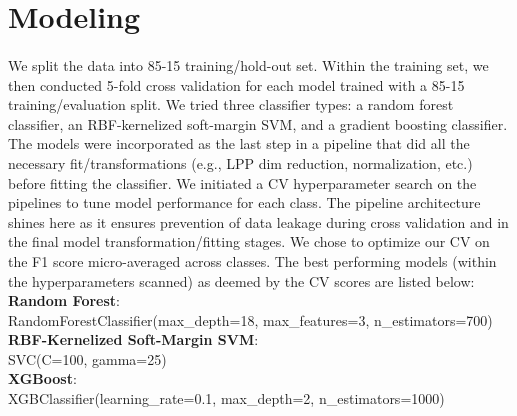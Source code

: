 \documentclass{article}
\begin{document}
\section{Modeling}
\paragraph{} We split the data into 85-15 training/hold-out set. Within the training set, we then conducted 5-fold cross validation for each model trained with a 85-15  training/evaluation split. We tried three classifier types: a random forest classifier, an RBF-kernelized soft-margin SVM, and a gradient boosting classifier. The models were incorporated as the last step in a pipeline that did all the necessary fit/transformations (e.g., LPP dim reduction, normalization, etc.) before fitting the classifier. We initiated a CV hyperparameter search on the pipelines to tune model performance for each class. The pipeline architecture shines here as it ensures prevention of data leakage during cross validation and in the final model transformation/fitting stages. We chose to optimize our CV on the F1 score micro-averaged across classes. The best performing models (within the hyperparameters scanned) as deemed by the CV scores are listed below: \\
\textbf{Random Forest}:\\ RandomForestClassifier(max\_depth=18, max\_features=3, n\_estimators=700) \\ 
\textbf{RBF-Kernelized Soft-Margin SVM}: \\ SVC(C=100, gamma=25) \\
\textbf{XGBoost}:\\ XGBClassifier(learning\_rate=0.1, max\_depth=2, n\_estimators=1000) \\
\end{document}
